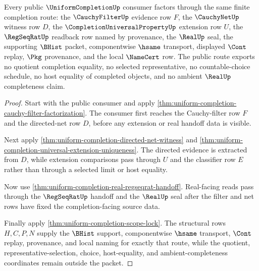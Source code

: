 \begin{theorem}
\label{thm:uniformcompletion-public-factorization}
Every public $\UniformCompletionUp$ consumer factors through the same finite completion route: the $\CauchyFilterUp$ evidence row $F$, the $\CauchyNetUp$ witness row $D$, the $\CompletionUniversalPropertyUp$ extension row $U$, the $\RegSeqRatUp$ readback row named by provenance, the $\RealUp$ seal, the supporting $\BHist$ packet, componentwise $\hsame$ transport, displayed $\Cont$ replay, $\Pkg$ provenance, and the local $\NameCert$ row. The public route exports no quotient completion equality, no selected representative, no countable-choice schedule, no host equality of completed objects, and no ambient $\RealUp$ completeness claim.
\end{theorem}
\begin{proof}
Start with the public consumer and apply \autoref{thm:uniform-completion-cauchy-filter-factorization}. The consumer first reaches the Cauchy-filter row $F$ and the directed-net row $D$, before any extension or real handoff data is visible.

Next apply \autoref{thm:uniform-completion-directed-net-witness} and \autoref{thm:uniform-completion-universal-extension-uniqueness}. The directed evidence is extracted from $D$, while extension comparisons pass through $U$ and the classifier row $E$ rather than through a selected limit or host equality.

Now use \autoref{thm:uniform-completion-real-regseqrat-handoff}. Real-facing reads pass through the $\RegSeqRatUp$ handoff and the $\RealUp$ seal after the filter and net rows have fixed the completion-facing source data.

Finally apply \autoref{thm:uniform-completion-scope-lock}. The structural rows $H,C,P,N$ supply the $\BHist$ support, componentwise $\hsame$ transport, $\Cont$ replay, provenance, and local naming for exactly that route, while the quotient, representative-selection, choice, host-equality, and ambient-completeness coordinates remain outside the packet.
\end{proof}


